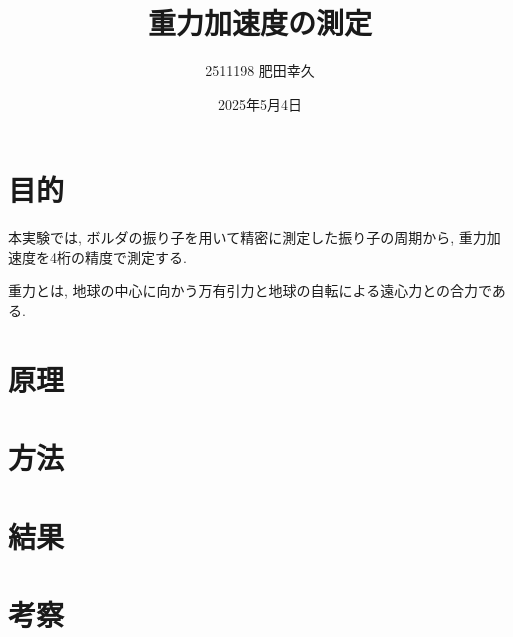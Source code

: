 \documentclass{jarticle}
\title{重力加速度の測定}
\author{2511198 肥田幸久}
\date{2025年5月4日}
\begin{document}
\maketitle

\section{目的}

本実験では, ボルダの振り子を用いて精密に測定した振り子の周期から, 重力加速度を4桁の精度で測定する.

重力とは, 地球の中心に向かう万有引力と地球の自転による遠心力との合力である.


\section{原理}

\section{方法}

\section{結果}

\section{考察}
\end{document}
